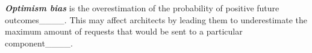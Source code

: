     \textbf{\textit{Optimism bias}} is the overestimation of the probability of positive future outcomes____. 
    \color{black}
    This may affect architects by leading them to underestimate the maximum amount of requests that would be sent to a particular component____.
    \color{black}


